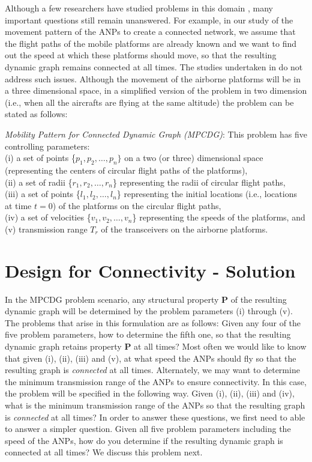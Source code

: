 \documentclass[10pt]{IEEEtran}
\begin{document}
Although a few researchers have studied problems in this domain \cite{Mesbahi051, Mesbahi052, Zav07}, many important questions still remain unanswered. For example, in our study of the movement pattern of the ANPs to create a connected network, we assume that the flight paths of the mobile platforms are already known and we want to find out the speed at which these platforms should move, so that the resulting dynamic graph remains connected at all times. The studies undertaken in \cite{Mesbahi051,Mesbahi052,Zav07} do not address such issues. Although the movement of the airborne platforms will be in a three dimensional space, in a  simplified version of the problem in two dimension (i.e., when all the aircrafts are flying at the same altitude) the problem can be stated as follows:

\noindent
{\em Mobility Pattern for Connected Dynamic Graph  (MPCDG)}: This problem has five controlling parameters:\\
(i) a set of points \{$p_1, p_2, \ldots, p_n\}$ on a two (or three) dimensional space (representing the centers of circular flight paths of the platforms),\\ (ii) a set of radii \{$r_1, r_2, \ldots, r_n$\} representing the radii of circular flight paths, \\(iii) a set of points \{$l_1, l_2, \ldots, l_n$\} representing the initial locations (i.e., locations at time $t = 0$) of the platforms on the circular flight paths, \\ (iv) a set of velocities \{$v_1, v_2, \ldots, v_n$\} representing the speeds of the platforms, and\\ (v) transmission range $T_r$ of the transceivers on the airborne platforms.

\section{Design for Connectivity - Solution}
\label{sec:connectivity}

In the MPCDG problem scenario, any structural property {\bf P} of the resulting dynamic graph will be determined by the problem parameters (i) through (v). The problems that arise in this formulation are as follows:  Given any four of the five problem parameters, how to determine the fifth one, so that the resulting dynamic graph retains property {\bf P} at all times?
Most often we would like to know that given (i), (ii), (iii) and (v), at what speed the ANPs should fly so that the resulting graph is {\em connected} at all times. Alternately, we may want to determine the minimum transmission range of the ANPs to ensure connectivity. In this case, the problem will be specified in the following way. Given (i), (ii), (iii) and (iv), what is the minimum  transmission range of the ANPs so that the resulting graph is {\em connected} at all times? In order to answer these questions, we first need to able to answer a simpler question. Given all five problem parameters including the speed of the ANPs, how do you determine if the resulting dynamic graph is connected at all times? We discuss this problem next.
\end{document}
